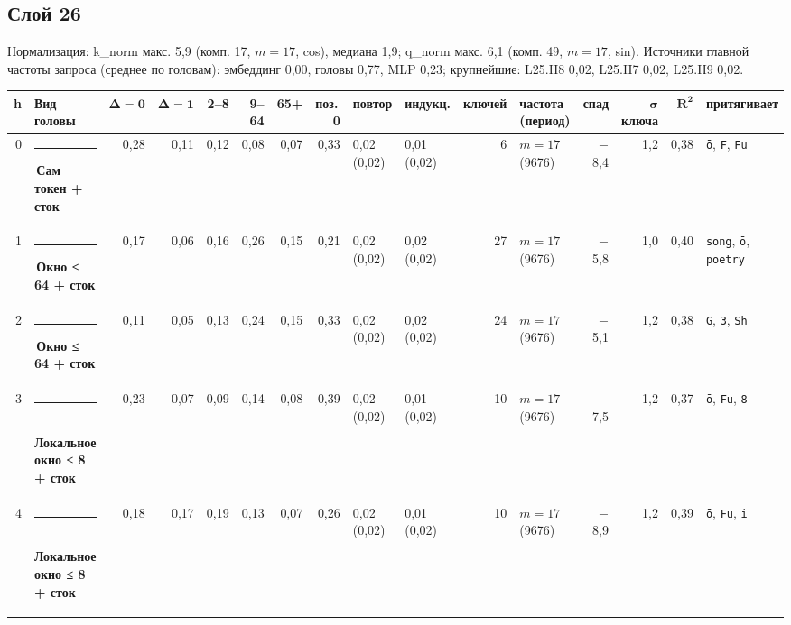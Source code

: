 \documentclass[10pt]{article}
\begin{document}
\noindent\begin{minipage}{\linewidth}
\subsection*{Слой 26}
{\small\color{ink2} Нормализация: k\_norm макс. 5,9 (комп. 17, $m{=}17$, cos), медиана 1,9; q\_norm макс. 6,1 (комп. 49, $m{=}17$, sin). Источники главной частоты запроса (среднее по головам): эмбеддинг 0,00, головы 0,77, MLP 0,23; крупнейшие: L25.H8 0,02, L25.H7 0,02, L25.H9 0,02.}
\begin{center}{\footnotesize\begin{tabular}{|r|l|r|r|r|r|r|r|l|l|r|l|r|r|r|l|}
\hline
\rowcolor{head}\textbf{h} & \textbf{Вид головы} & $\boldsymbol{\Delta{=}0}$ & $\boldsymbol{\Delta{=}1}$ & \textbf{2–8} & \textbf{9–64} & \textbf{65+} & \textbf{поз.\,0} & \textbf{повтор} & \textbf{индукц.} & \textbf{ключей} & \textbf{частота (период)} & \textbf{спад} & $\boldsymbol{\sigma}$ \textbf{ключа} & $\boldsymbol{R^2}$ & \textbf{притягивает} \\ \hline
0 & \textcolor[HTML]{2A78D6}{\rule{0.62em}{0.62em}}\,\textbf{Сам токен + сток} & 0,28 & 0,11 & 0,12 & 0,08 & 0,07 & 0,33 & 0,02 (0,02) & 0,01 (0,02) & 6 & $m{=}17$ (9676) & $-$8,4 & 1,2 & 0,38 & \texttt{ō}, \texttt{\textvisiblespace{}F}, \texttt{\textvisiblespace{}Fu} \\ \hline
1 & \textcolor[HTML]{EDA100}{\rule{0.62em}{0.62em}}\,\textbf{Окно ≤ 64 + сток} & 0,17 & 0,06 & 0,16 & 0,26 & 0,15 & 0,21 & 0,02 (0,02) & 0,02 (0,02) & 27 & $m{=}17$ (9676) & $-$5,8 & 1,0 & 0,40 & \texttt{\textvisiblespace{}song}, \texttt{ō}, \texttt{\textvisiblespace{}poetry} \\ \hline
2 & \textcolor[HTML]{EDA100}{\rule{0.62em}{0.62em}}\,\textbf{Окно ≤ 64 + сток} & 0,11 & 0,05 & 0,13 & 0,24 & 0,15 & 0,33 & 0,02 (0,02) & 0,02 (0,02) & 24 & $m{=}17$ (9676) & $-$5,1 & 1,2 & 0,38 & \texttt{\textvisiblespace{}G}, \texttt{3}, \texttt{\textvisiblespace{}Sh} \\ \hline
3 & \textcolor[HTML]{1BAF7A}{\rule{0.62em}{0.62em}}\,\textbf{Локальное окно ≤ 8 + сток} & 0,23 & 0,07 & 0,09 & 0,14 & 0,08 & 0,39 & 0,02 (0,02) & 0,01 (0,02) & 10 & $m{=}17$ (9676) & $-$7,5 & 1,2 & 0,37 & \texttt{ō}, \texttt{\textvisiblespace{}Fu}, \texttt{8} \\ \hline
4 & \textcolor[HTML]{1BAF7A}{\rule{0.62em}{0.62em}}\,\textbf{Локальное окно ≤ 8 + сток} & 0,18 & 0,17 & 0,19 & 0,13 & 0,07 & 0,26 & 0,02 (0,02) & 0,01 (0,02) & 10 & $m{=}17$ (9676) & $-$8,9 & 1,2 & 0,39 & \texttt{ō}, \texttt{\textvisiblespace{}Fu}, \texttt{i} \\ \hline

\end{tabular}}
\end{center}
\end{minipage}
\end{document}

